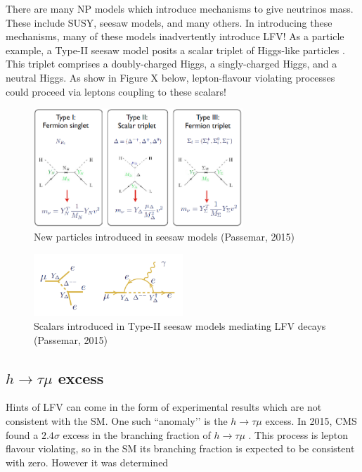 \documentclass[12pt]{thesis}  %
\newcommand{\htm}{h\to \tau \mu}
\begin{document}
There are many NP models which introduce mechanisms to give neutrinos mass. These include SUSY, seesaw models, and many others. In introducing these mechanisms, many of these models inadvertently introduce LFV! As a particle example, a Type-II seesaw model posits a scalar triplet of Higgs-like particles \cite{Passemar:2015}. This triplet comprises a doubly-charged Higgs, a singly-charged Higgs, and a neutral Higgs. As show in Figure X below, lepton-flavour violating processes could proceed via leptons coupling to these scalars!


\begin{figure}[h]
\centering
\includegraphics[width=0.7\textwidth]{images/seesaw.png}
\caption{New particles introduced in seesaw models (Passemar, 2015)}
\label{}
\end{figure}

\begin{figure}[h]
\centering
\includegraphics[width=0.5\textwidth]{images/seesaw-lfv-modes.png}
\caption{Scalars introduced in Type-II seesaw models mediating LFV decays (Passemar, 2015)}
\label{}
\end{figure}




\subsection{$\htm$ excess}

Hints of LFV can come in the form of experimental results which are not consistent with the SM. One such ``anomaly’’ is the $\htm$ excess. In 2015, CMS found a $2.4\sigma$ excess in the branching fraction of $\htm$ \cite{CMS:2015a}. This process is lepton flavour violating, so in the SM its branching fraction is expected to be consistent with zero. However it was determined
\end{document}
